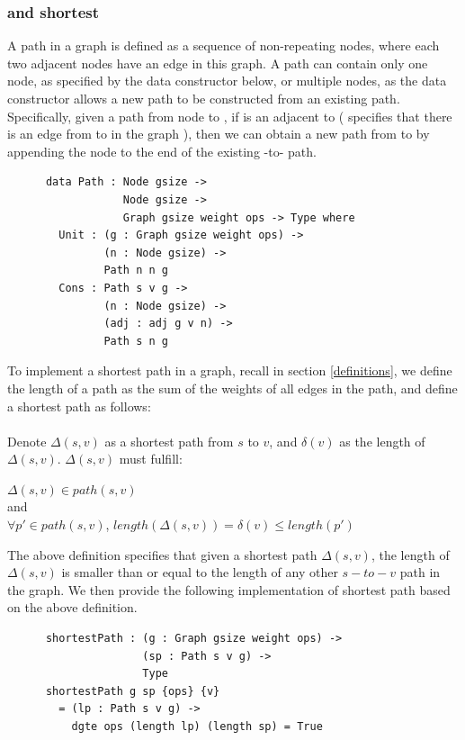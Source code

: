 \subsubsection{ and shortest } \label{path}
A path in a graph is defined as a sequence of non-repeating nodes, where each two adjacent nodes have an edge in this graph. A path can contain only one node, as specified by the  data constructor below, or multiple nodes, as the  data constructor allows a new path to be constructed from an existing path. Specifically, given a path from node  to , if  is an adjacent to  ( specifies that there is an edge from  to  in the graph ), then we can obtain a new path from  to  by appending the node  to the end of the existing -to- path. 
\begin{lstlisting} 
      data Path : Node gsize ->
                  Node gsize ->
                  Graph gsize weight ops -> Type where
        Unit : (g : Graph gsize weight ops) ->
               (n : Node gsize) ->
               Path n n g
        Cons : Path s v g ->
               (n : Node gsize) ->
               (adj : adj g v n) ->
               Path s n g
\end{lstlisting}

To implement a shortest path in a graph, recall in section \ref{definitions}, we define the length of a path as the sum of the weights of all edges in the path, and define a shortest path as follows:
\\\\
\tab Denote $\Delta(s, v)$ as a shortest path from $s$ to $v$, and $\delta(v)$ as the length of $\Delta(s, v)$. $\Delta(s, v)$ must fulfill: 
\begin{center}
$\Delta(s, v) \in path(s, v)$ 
\\
and 
\\
$\forall p' \in path(s, v)$, $length(\Delta(s, v)) = \delta(v) \leq length(p')$
\end{center}

The above definition specifies that given a shortest path $\Delta(s, v)$, the length of $\Delta(s, v)$ is smaller than or equal to the length of any other $s-to-v$ path in the graph. We then provide the following implementation of shortest path based on the above definition. 

\begin{lstlisting}
      shortestPath : (g : Graph gsize weight ops) ->
                     (sp : Path s v g) ->
                     Type
      shortestPath g sp {ops} {v}
        = (lp : Path s v g) ->
          dgte ops (length lp) (length sp) = True
\end{lstlisting}

